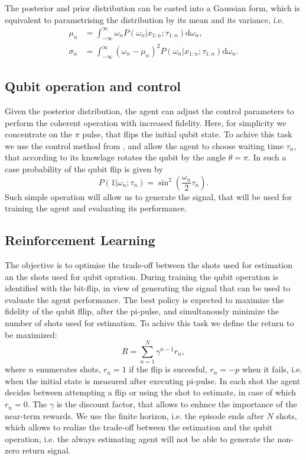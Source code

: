\documentclass[aps,twocolumn,pra,notitlepage,]{revtex4-2}
\begin{document}
The posterior and prior distribution can be casted into a Gaussian form, which is equivalent to parametrising the distribution by its mean and its variance, i.e. 
\begin{align}
    \mu_n &= \int_{-\infty}^{\infty} \omega_n  P(\omega_n|x_{1:n};\tau_{1:n}) \text{d}\omega_n, \nonumber \\ \sigma_n &= \int_{-\infty}^{\infty} (\omega_n - \mu_n)^2  P(\omega_n|x_{1:n};\tau_{1:n}) \text{d}\omega_n.
\end{align}

\subsection{Qubit operation and control}
Given the posterior distribution, the agent can adjust the control parameters to perform the coherent operation with increased fidelity. Here, for simplicity we concentrate on the $\pi$ pulse, that flips the initial qubit state. To achive this task we use the control method from \cite{}, and allow the agent to choose waiting time $\tau_{n}$, that according to its knowlage rotates the qubit by the angle $\theta = \pi$. In such a case probability of the qubit flip is given by
\begin{equation}
    P(1|\omega_n;\tau_n) = \sin^2\left(\frac{\omega_n}{2}\tau_n\right).
\end{equation}
Such simple operation will allow us to generate the signal, that will be used for training the agent and evaluating its performance. 

\subsection{Reinforcement Learning}
The objective is to optimise the trade-off between the shots used for estimation an the shots used for qubit opration. During training the qubit operation is identified with the bit-flip, in view of generating the signal that can be used to evaluate the agent performance. The best policy is expected to maximize the fidelity of the qubit fllip, after the pi-pulse, and simultanously minimize the number of shots used for estimation. To achive this task we define the return to be maximized:
\begin{equation}
    R = \sum_{n=1}^{N} \gamma^{n-1} r_n,
\end{equation}
where $n$ enumerates shots, $r_n = 1$ if the flip is succesful, $r_n = -p$ when it fails, i.e. when the initial state is measured after executing pi-pulse. In each shot the agent decides between attempting a flip or using the shot to estimate, in case of which $r_n = 0$. The $\gamma$ is the discount factor, that allows to enhnce the importance of the near-term rewards. We use the finite horizon, i.e. the episode ends after $N$ shots, which allows to realize the trade-off between the estimation and the qubit operation, i.e. the always estimating agent will not be able to generate the non-zero return signal. 
\end{document}
